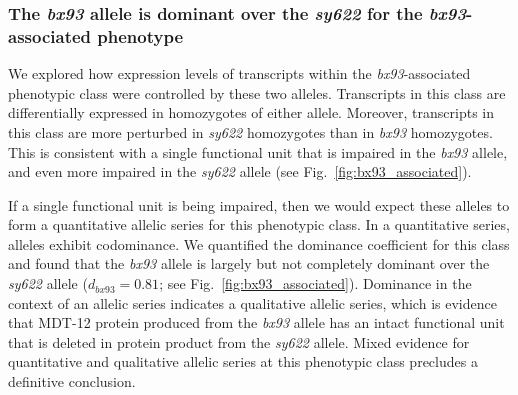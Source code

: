 \documentclass[10pt, twocolumn]{article}
\newcommand{\protein}[1]{\mbox{\uppercase{#1}}}
\begin{document}
\subsubsection*{The \emph{bx93} allele is dominant over the \emph{sy622} for the
                \emph{bx93}-associated phenotype}
We explored how expression levels of transcripts within the
\emph{bx93}-associated phenotypic class were controlled by these two alleles.
Transcripts in this class are differentially expressed in homozygotes of either
allele. Moreover, transcripts in this class are more perturbed in \emph{sy622}
homozygotes than in \emph{bx93} homozygotes. This is consistent with a single
functional unit that is impaired in the \emph{bx93} allele, and even more
impaired in the \emph{sy622} allele (see Fig.~\ref{fig:bx93_associated}).

If a single functional unit is being impaired, then we would expect these
alleles to form a quantitative allelic series for this phenotypic class. In a
quantitative series, alleles exhibit codominance. We quantified the dominance
coefficient for this class and found that the \emph{bx93} allele is largely but
not completely dominant over the \emph{sy622} allele ($d_{bx93}=0.81$; see
Fig.~\ref{fig:bx93_associated}). Dominance in the context of an allelic series
indicates a qualitative allelic series, which is evidence
that \protein{MDT-12} protein produced from the \emph{bx93} allele has an intact
functional unit that is deleted in protein product from the \emph{sy622}
allele. Mixed evidence for quantitative and qualitative allelic series at this
phenotypic class precludes a definitive conclusion.
\end{document}
